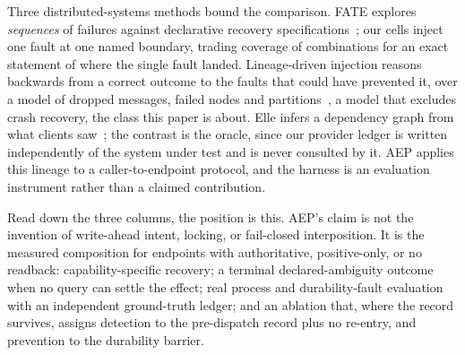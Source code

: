 Three distributed-systems methods bound the comparison. FATE explores
\emph{sequences} of failures against declarative recovery
specifications~\cite{gunawi2011fate}; our cells inject one fault at one named
boundary, trading coverage of combinations for an exact statement of where the
single fault landed. Lineage-driven injection reasons backwards from a correct
outcome to the faults that could have prevented it, over a model of dropped
messages, failed nodes and partitions~\cite{alvaro2015ldfi}, a model that
excludes crash recovery, the class this paper is about. Elle infers a dependency
graph from what clients saw~\cite{kingsbury2020elle}; the contrast is the
oracle, since our provider ledger is written independently of the system under
test and is never consulted by it. AEP applies this lineage to a
caller-to-endpoint protocol, and the harness is an evaluation instrument rather
than a claimed contribution.


Read down the three columns, the position is this. AEP's claim is not the
invention of write-ahead intent, locking, or fail-closed interposition. It is the
measured composition for endpoints with authoritative, positive-only, or no
readback: capability-specific recovery; a terminal declared-ambiguity outcome
when no query can settle the effect; real process and durability-fault evaluation
with an independent ground-truth ledger; and an ablation that, where the record
survives, assigns detection to the pre-dispatch record plus no re-entry, and
prevention to the durability barrier.
